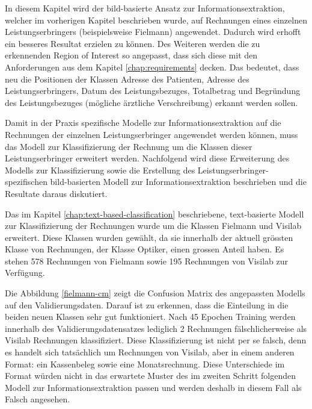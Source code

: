 In diesem Kapitel wird der bild-basierte Ansatz zur Informationsextraktion, welcher im vorherigen Kapitel beschrieben wurde, auf Rechnungen eines einzelnen Leistungserbringers (beispielsweise Fielmann) angewendet. Dadurch wird erhofft ein besseres Resultat erzielen zu können. Des Weiteren werden die zu erkennenden Region of Interest so angepasst, dass sich diese mit den Anforderungen aus dem Kapitel \ref{chap:requirements} decken. Das bedeutet, dass neu die Positionen der Klassen Adresse des Patienten, Adresse des Leistungserbringers, Datum des Leistungsbezuges, Totalbetrag und Begründung des Leistungsbezuges (mögliche ärztliche Verschreibung) erkannt werden sollen.

Damit in der Praxis spezifische Modelle zur Informationsextraktion auf die Rechnungen der einzelnen Leistungserbringer angewendet werden können, muss das Modell zur Klassifizierung der Rechnung um die Klassen dieser Leistungserbringer erweitert werden. Nachfolgend wird diese Erweiterung des Modells zur Klassifizierung sowie die Erstellung des Leistungserbringer-spezifischen bild-basierten Modell zur Informationsextraktion beschrieben und die Resultate daraus diskutiert.

Das im Kapitel \ref{chap:text-based-classification} beschriebene, text-basierte Modell zur Klassifizierung der Rechnungen wurde um die Klassen Fielmann und Visilab erweitert. Diese Klassen wurden gewählt, da sie innerhalb der aktuell grössten Klasse von Rechnungen, der Klasse Optiker, einen grossen Anteil haben. Es stehen 578 Rechnungen von Fielmann sowie 195 Rechnungen von Visilab zur Verfügung.

Die Abbildung \ref{fielmann-cm} zeigt die Confusion Matrix des angepassten Modells auf den Validierungsdaten. Darauf ist zu erkennen, dass die Einteilung in die beiden neuen Klassen sehr gut funktioniert. Nach 45 Epochen Training werden innerhalb des Validierungsdatensatzes lediglich 2 Rechnungen fälschlicherweise als Visilab Rechnungen klassifiziert. Diese Klassifizierung ist nicht per se falsch, denn es handelt sich tatsächlich um Rechnungen von Visilab, aber in einem anderen Format: ein Kassenbeleg sowie eine Monatsrechnung. Diese Unterschiede im Format würden nicht in das erwartete Muster des im zweiten Schritt folgenden Modell zur Informationsextraktion passen und werden deshalb in diesem Fall als Falsch angesehen.

